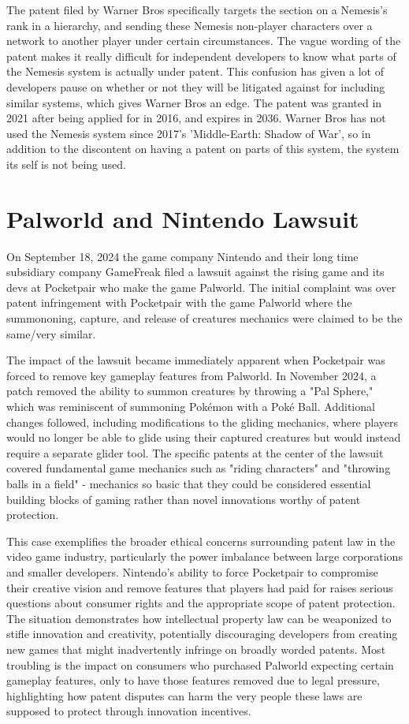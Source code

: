 \documentclass[12pt,letterpaper]{article}
\begin{document}
The patent \cite{wb} filed by Warner Bros specifically targets the section on a Nemesis's rank in a hierarchy, and sending these Nemesis non-player characters over a network to another player under certain circumstances. The vague wording of the patent makes it really difficult for independent developers to know what parts of the Nemesis system is actually under patent.
This confusion has given a lot of developers pause on whether or not they will be litigated against for including similar systems, which gives Warner Bros an edge. The patent was granted in 2021 after being applied for in 2016, and expires in 2036. Warner Bros has not used the Nemesis system since 2017's 'Middle-Earth: Shadow of War', so in addition to the discontent on having a patent on parts of this system, the system its self is not being used.

\section{Palworld and Nintendo Lawsuit}
On September 18, 2024 the game company Nintendo and their long time subsidiary company GameFreak filed a lawsuit against the rising game and its devs at Pocketpair who make the game Palworld. The initial complaint was over patent infringement with Pocketpair with the game Palworld where the summononing, capture, and release of creatures mechanics were claimed to be the same/very similar.

The impact of the lawsuit became immediately apparent when Pocketpair was forced to remove key gameplay features from Palworld. In November 2024, a patch removed the ability to summon creatures by throwing a "Pal Sphere," which was reminiscent of summoning Pokémon with a Poké Ball. Additional changes followed, including modifications to the gliding mechanics, where players would no longer be able to glide using their captured creatures but would instead require a separate glider tool. The specific patents at the center of the lawsuit covered fundamental game mechanics such as "riding characters" and "throwing balls in a field" - mechanics so basic that they could be considered essential building blocks of gaming rather than novel innovations worthy of patent protection.

This case exemplifies the broader ethical concerns surrounding patent law in the video game industry, particularly the power imbalance between large corporations and smaller developers. Nintendo's ability to force Pocketpair to compromise their creative vision and remove features that players had paid for raises serious questions about consumer rights and the appropriate scope of patent protection. The situation demonstrates how intellectual property law can be weaponized to stifle innovation and creativity, potentially discouraging developers from creating new games that might inadvertently infringe on broadly worded patents. Most troubling is the impact on consumers who purchased Palworld expecting certain gameplay features, only to have those features removed due to legal pressure, highlighting how patent disputes can harm the very people these laws are supposed to protect through innovation incentives.
\end{document}
